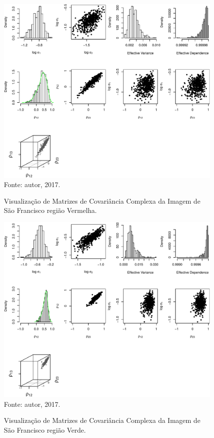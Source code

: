 \documentclass[journal]{IEEEtran}
\begin{document}
\newpage

\begin{figure}[ht]
\centering
\caption{Visualização de Matrizes de Covariância Complexa da Imagem de São Francisco região Vermelha.}
\includegraphics[width=\linewidth]{../../Figuras/Amostras-SanFrancisc/SanFrancisc-Vermelha-500.pdf}\\
Fonte: autor, 2017.
\label{visSanFrancisc3}
\end{figure}

\newpage

\begin{figure}[ht]
\centering
\caption{Visualização de Matrizes de Covariância Complexa da Imagem de São Francisco região Verde.}
\includegraphics[width=\linewidth]{../../Figuras/Amostras-SanFrancisc/SanFrancisc-Verde-500.pdf}\\
Fonte: autor, 2017.
\label{visSanFrancisc4}
\end{figure}
\end{document}

